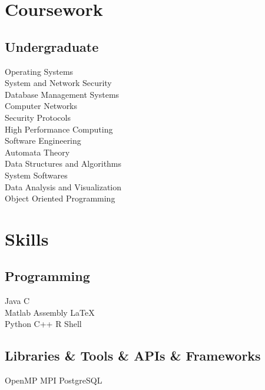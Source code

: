 \documentclass[]{deedy-resume-openfont}
\begin{document}
\begin{minipage}[t]{0.33\textwidth}

\section{Coursework}
\subsection{Undergraduate}
Operating Systems \\
System and Network Security \\
Database Management Systems \\
Computer Networks \\
Security Protocols \\
High Performance Computing\\
Software Engineering\\
Automata Theory\\
Data Structures and Algorithms\\
System Softwares\\
Data Analysis and Visualization\\
Object Oriented Programming\\
\sectionsep


\section{Skills}
\subsection{Programming}
\textbullet{} Java  \textbullet{} C \\
\textbullet{} Matlab \textbullet{} Assembly \textbullet{} \LaTeX{}\\
\textbullet{} Python \textbullet{} C++ \textbullet{} R \textbullet{} Shell
\sectionsep

\subsection{\texorpdfstring{Libraries \& Tools \& \newline APIs \& Frameworks}{}}
\textbullet{} OpenMP \textbullet{} MPI \textbullet{} PostgreSQL
\sectionsep

%
%

\end{minipage} 
\end{document}

